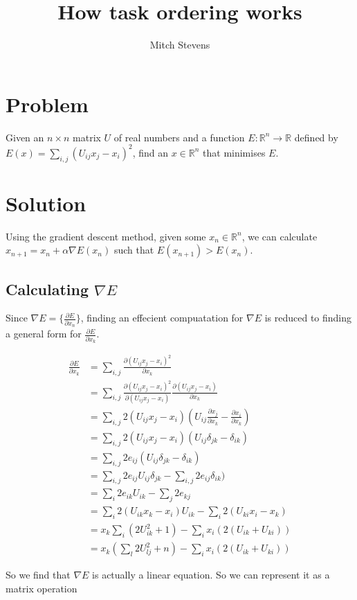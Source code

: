 \documentclass{article}
\title{How task ordering works}
\author{Mitch Stevens}
\begin{document}
\section{Problem}
Given an $n \times n$ matrix $U$ of real numbers and a function $E:\mathbb{R}^n
\to \mathbb{R}$ defined by $E(x) = \sum_{i, j} ( U_{ij}x_j - x_i )^2$, find an
$x\in \mathbb{R}^n$ that minimises $E$.

\section{Solution}
Using the gradient descent method, given some $x_n \in \mathbb{R}^n$, we can
calculate $x_{n+1} = x_n + \alpha \nabla E(x_n)$ such that $E(x_{n+1}) >E(x_n)$.

\subsection{Calculating $\nabla E$}
Since $\nabla E = \{\frac{\partial E}{\partial x_n}\}$, finding an effecient
compuatation for $\nabla E$ is reduced to finding a general form for
$\frac{\partial E}{\partial x_k}$.

\begin{align*}
\frac{\partial E}{\partial x_k} &= \sum_{i,j} \frac{\partial ( U_{ij}x_j - x_i
)^2}{\partial x_k} \\
&= \sum_{i,j} \frac{\partial ( U_{ij}x_j - x_i)^2}{\partial (U_{ij}x_j - x_i)}
\frac{\partial (U_{ij}x_j - x_i)}{\partial x_k} \\
&= \sum_{i,j} 2(U_{ij}x_j - x_i) (U_{ij} \frac{\partial x_j}{\partial x_k} -
\frac{\partial x_i}{\partial x_k}) \\
&= \sum_{i,j} 2(U_{ij}x_j - x_i)(U_{ij}\delta_{jk} - \delta_{ik}) \\
&= \sum_{i,j} 2e_{ij} (U_{ij}\delta_{jk} - \delta_{ik}) \\
&= \sum_{i,j} 2e_{ij} U_{ij}\delta_{jk} - \sum_{i,j} 2e_{ij}\delta_{ik}) \\
&= \sum_i 2e_{ik} U_{ik} - \sum_j 2e_{kj} \\
&= \sum_i 2(U_{ik}x_k - x_i) U_{ik} - \sum_i 2(U_{ki}x_i - x_k) \\
&= x_k \sum_i (2U_{ik}^2 + 1) -\sum_i x_i(2(U_{ik} +U_{ki})) \\
&= x_k (\sum_l 2U_{lj}^2 + n) -\sum_i x_i(2(U_{ik} +U_{ki}))
\end{align*}

So we find that $\nabla E$ is actually a linear equation. So we can represent it
as a matrix operation
\end{document}
